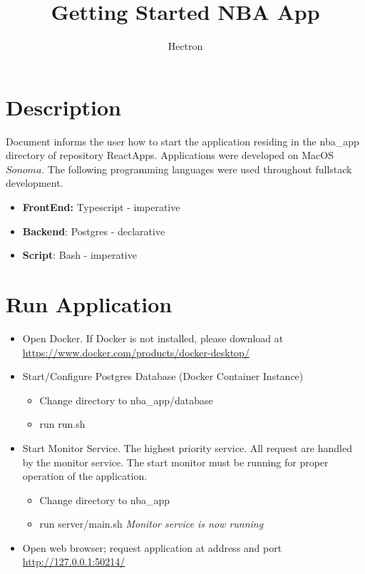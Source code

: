 \documentclass[a4paper,11pt]{article}
\author{Hectron}
\title{Getting Started NBA App}
\newcommand{\newpagex}{
    \newpage
    \vspace*{-7\baselineskip} %
}
\begin{document}
    \maketitle
    \tableofcontents
    \newpagex
    \noindent

    \section{Description}
        Document informs the user how to start the application residing in the nba\_app  directory of repository ReactApps. 
        Applications were developed on MacOS \(Sonoma\). The following programming languages were used throughout fullstack development.
        \begin{itemize}
            \item \textbf{FrontEnd:} \newline \textmd{Typescript - imperative}
            \item \textbf{Backend}: \newline  \textmd{Postgres - declarative}
            \item \textbf{Script}: \newline  \textmd{Bash - imperative}
        \end{itemize}

    \section{Run Application}
        \begin{itemize}
            \item  Open Docker. If Docker is not installed, please download at \hypersetup{colorlinks=false,urlcolor=black } \url{https://www.docker.com/products/docker-desktop/} 
            \item Start/Configure Postgres Database (Docker Container Instance) 
            \begin{itemize}
                \item Change directory to nba\_app/database
                \item run run.sh 
            \end{itemize}
            \item Start Monitor Service.
                \newline 
            The highest priority service. All request are handled by the monitor service. The start monitor must be running for proper operation of the application. 
                \begin{itemize}
                \item Change directory to nba\_app
                \item run server/main.sh \quad \small \textit{Monitor service is now running }
            \end{itemize}

            \item Open web browser; request application at address and port \url{ http://127.0.0.1:50214/ }
        \end{itemize}
            
\end{document}
